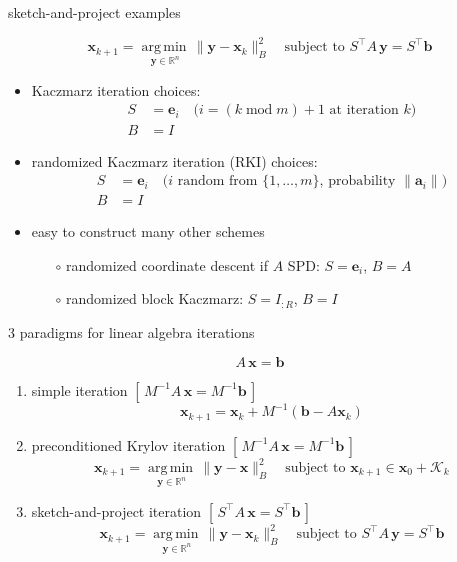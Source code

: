 \documentclass[usepdftitle=false,usenames,dvipsnames]{beamer}
\newcommand{\RR}{\mathbb{R}}
\newcommand{\argmin}[1]{\underset{#1}{\operatorname{arg\, min}\,}}
\newcommand{\ba}{\mathbf{a}}
\newcommand{\bb}{\mathbf{b}}
\newcommand{\be}{\mathbf{e}}
\newcommand{\bx}{\mathbf{x}}
\newcommand{\by}{\mathbf{y}}
\begin{document}
\begin{frame}{sketch-and-project examples}

$$\bx_{k+1} = \argmin{\by \in \RR^n} \|\by - \bx_k\|_B^2 \quad \text{subject to } S^\top A\, \by = S^\top \bb$$

\begin{itemize}
\item Kaczmarz iteration choices:
\begin{align*}
S &= \be_i \quad \text{($i = (k \operatorname{mod} m) + 1$ at iteration $k$)} \\
B &= I
\end{align*}
\item randomized Kaczmarz iteration (RKI) choices:
\begin{align*}
S &= \be_i \quad \text{($i$ random from $\{1,\dots,m\}$, probability $\|\ba_i\|$)} \\
B &= I
\end{align*}
\item easy to construct many other schemes
    \begin{itemize}
    \item[$\circ$] randomized coordinate descent if $A$ SPD: $S=\be_i$, $B=A$
    \item[$\circ$] randomized block Kaczmarz: $S=I_{:R}$, $B=I$
    \end{itemize}
\end{itemize}
\end{frame}


\begin{frame}{3 paradigms for linear algebra iterations}

$$A\,\bx = \bb$$

\begin{enumerate}
\item \alert{simple iteration} \hfill {\footnotesize $\left[\,M^{-1} A\, \bx = M^{-1} \bb\,\right]$}
    $$\bx_{k+1} = \bx_k + M^{-1} \left(\bb - A \bx_k\right)$$
\item \alert{preconditioned Krylov iteration} \hfill {\footnotesize $\left[\,M^{-1} A\, \bx = M^{-1} \bb\,\right]$}
    $$\bx_{k+1} = \argmin{\by \in \RR^n} \|\by - \bx\|_B^2 \quad \text{subject to } \bx_{k+1} \in \bx_0 + \mathcal{K}_{k}$$
\item \alert{sketch-and-project iteration} \hfill {\footnotesize $\left[\,S^\top A\, \bx = S^\top \bb\,\right]$}
    $$\bx_{k+1} = \argmin{\by \in \RR^n} \|\by - \bx_k\|_B^2 \quad \text{subject to } S^\top A\, \by = S^\top \bb$$
\end{enumerate}
\end{frame}
\end{document}
